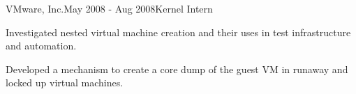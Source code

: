 
\begin{rSubsection}{VMware, Inc.}{May 2008 - Aug 2008}{Kernel Intern}{}
  \item[] Investigated nested virtual machine creation and their uses in test infrastructure and automation.
  \item[] Developed a mechanism to create a core dump of the guest VM in runaway and locked up virtual machines.
\end{rSubsection}


